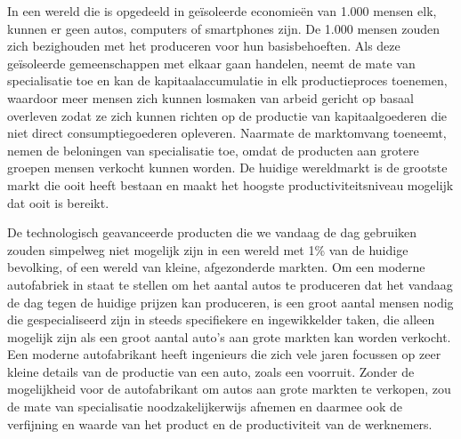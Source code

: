 In een wereld die is opgedeeld in geïsoleerde economieën van 1.000 mensen elk, kunnen er geen auto\textquotesingle s, computers of smartphones zijn. De 1.000 mensen zouden zich bezighouden met het produceren voor hun basisbehoeften. Als deze geïsoleerde gemeenschappen met elkaar gaan handelen, neemt de mate van specialisatie toe en kan de kapitaalaccumulatie in elk productieproces toenemen, waardoor meer mensen zich kunnen losmaken van arbeid gericht op basaal overleven zodat ze zich kunnen richten op de productie van kapitaalgoederen die niet direct consumptiegoederen opleveren. Naarmate de marktomvang toeneemt, nemen de beloningen van specialisatie toe, omdat de producten aan grotere groepen mensen verkocht kunnen worden. De huidige wereldmarkt is de grootste markt die ooit heeft bestaan en maakt het hoogste productiviteitsniveau mogelijk dat ooit is bereikt.

De technologisch geavanceerde producten die we vandaag de dag gebruiken zouden simpelweg niet mogelijk zijn in een wereld met 1\% van de huidige bevolking, of een wereld van kleine, afgezonderde markten. Om een moderne autofabriek in staat te stellen om het aantal auto\textquotesingle s te produceren dat het vandaag de dag tegen de huidige prijzen kan produceren, is een groot aantal mensen nodig die gespecialiseerd zijn in steeds specifiekere en ingewikkelder taken, die alleen mogelijk zijn als een groot aantal auto's aan grote markten kan worden verkocht. Een moderne autofabrikant heeft ingenieurs die zich vele jaren focussen op zeer kleine details van de productie van een auto, zoals een voorruit. Zonder de mogelijkheid voor de autofabrikant om auto\textquotesingle s aan grote markten te verkopen, zou de mate van specialisatie noodzakelijkerwijs afnemen en daarmee ook de verfijning en waarde van het product en de productiviteit van de werknemers.

